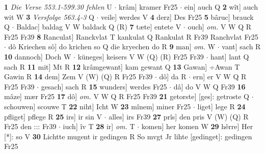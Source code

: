 \documentclass[8pt,a4paper,notitlepage]{article}
\begin{document}
\begin{table}[ht]
\begin{minipage}[t]{0.5\linewidth}
\textbf{1} \textit{Die Verse 553.1-599.30 fehlen} U   $\cdot$ krâm] kramer Fr25  $\cdot$ ein] auch Q \textbf{2} wît] auch wit W \textbf{3} \textit{Versfolge 563.4-3} Q   $\cdot$ veile] werdes V \textbf{4} derz] Des Fr25 \textbf{5} bâruc] brauck Q  $\cdot$ Baldac] baldag V W baldack Q (R) \textbf{7} tæte] entete V  $\cdot$ ouch] \textit{om.} V W Q R Fr25 Fr39 \textbf{8} Ranculat] Ranckvlat T kankulat Q Rankulat R Fr39 Ranchvlat Fr25  $\cdot$ dô Kriechen sô] do krichen so Q die kryechen do R \textbf{9} man] \textit{om.} W  $\cdot$ vant] sach R \textbf{10} dannoch] Doch W  $\cdot$ küneges] keisers V W (Q) (R) Fr25 Fr39  $\cdot$ hant] lant Q sach R \textbf{11} mit] Mt R \textbf{12} krâmgewant] kam gewant Q \textbf{13} Gawan] ÷Awan T Gawin R \textbf{14} dem] Zem V (W) (Q) R Fr25 Fr39  $\cdot$ dô] da R  $\cdot$ ern] er V W Q R Fr25 Fr39  $\cdot$ gesach] sach R \textbf{15} wunders] werdes Fr25  $\cdot$ dâ] do V W Q Fr39 \textbf{16} mâze] mær Fr25 \textbf{17} dô] \textit{om.} V W Q R Fr25 Fr39 \textbf{21} getorste] [ges]: getroste Q  $\cdot$ schouwen] scouwe T \textbf{22} niht] Icht W \textbf{23} mînem] miner Fr25  $\cdot$ liget] lege R \textbf{24} pfliget] pflege R \textbf{25} irs] ir sin V  $\cdot$ alles] irs Fr39 \textbf{27} prîs] den pris V (W) (Q) R Fr25 den ::: Fr39  $\cdot$ iuch] îv T \textbf{28} ir] \textit{om.} T  $\cdot$ komen] her komen W \textbf{29} hêrre] Her [*]: so V \textbf{30} Lichtte mugent ir gedingen R So mvgt Jr lihte [gedinget]: gedingen Fr25 \newline
\end{minipage}
\end{table}
\end{document}
